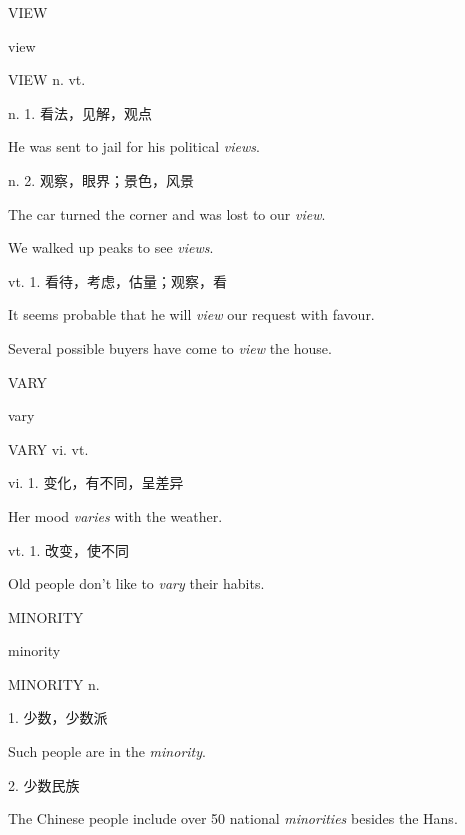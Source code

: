\begin{flashcard}{
VIEW

view
}
\begin{center}
VIEW n. vt. 
\end{center}
n. 1. 看法，见解，观点

He was sent to jail for his political \textit{views}.

n. 2. 观察，眼界；景色，风景

The car turned the corner and was lost to our \textit{view}.

We walked up peaks to see \textit{views}.

vt. 1. 看待，考虑，估量；观察，看

It seems probable that he will \textit{view} our request with favour.

Several possible buyers have come to \textit{view} the house.

\end{flashcard}
\begin{flashcard}{
VARY

vary
}
\begin{center}
VARY vi. vt. 
\end{center}
vi. 1. 变化，有不同，呈差异

Her mood \textit{varies} with the weather.

vt. 1. 改变，使不同

Old people don't like to \textit{vary} their habits.

\end{flashcard}
\begin{flashcard}{
MINORITY

minority
}
\begin{center}
MINORITY n. 
\end{center}
1. 少数，少数派

Such people are in the \textit{minority}.

2. 少数民族

The Chinese people include over 50 national \textit{minorities} besides the Hans.

\end{flashcard}
